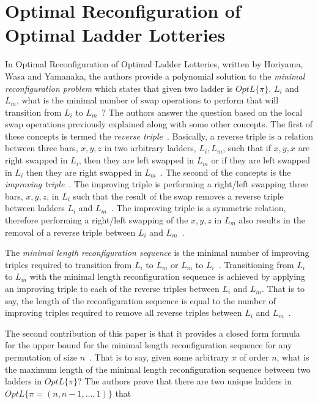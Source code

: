 
\section{Optimal Reconfiguration of Optimal Ladder Lotteries}
In Optimal Reconfiguration of Optimal Ladder Lotteries, written by Horiyama, Wasa and Yamanaka,
the authors provide a polynomial solution to the 
\emph{minimal reconfiguration problem} which states that given 
two ladder is $OptL\{\pi\}$, $L_{i}$ and  $L_{m}$, what is the minimal number of 
swap operations to perform that will transition from $L_{i}$ to $L_{m}$~\cite{A2}?
The authors answer the question based on the local swap operations previously 
explained along with some other concepts. The first of these concepts 
is termed the \emph{reverse triple}~\cite{A2}. Basically, a reverse triple is a relation
between three bars, $x,y,z$ in two arbitrary ladders, $L_{i}, L_{m}$, such that if $x,y,x$
are right swapped in $L_{i}$, then they are left swapped in $L_{m}$ or if they are 
left swapped in $L_{i}$ then they are right swapped in $L_{m}$~\cite{A2}. 
The second of the concepts is the \emph{improving triple}~\cite{A2}. The improving triple is 
performing a right/left swapping three bars, $x,y,z$, in $L_{i}$ such that the 
result of the swap removes a reverse triple between
ladders $L_{i}$ and $L_{m}$~\cite{A2}. The improving triple is a symmetric 
relation, therefore performing a right/left swapping of the $x,y,z$ in $L_{m}$ also results in the 
removal of a reverse triple between $L_{i}$ and $L_{m}$~\cite{A2}.\par
The \emph{minimal length reconfiguration sequence} is the minimal number of 
improving triples required to transition from $L_{i}$ to $L_{m}$ or 
$L_{m}$ to $L_{i}$~\cite{A2}. Transitioning from $L_{i}$ to $L_{m}$ with the minimal length reconfiguration sequence 
is achieved by applying an improving triple to each of the reverse triples between 
$L_{i}$ and $L_{m}$. That is to say, the length of the reconfiguration sequence 
is equal to the number of improving triples required to remove all reverse triples between $L_{i}$ and  $L_{m}$~\cite{A2}.\par
The second contribution of this paper is that it provides a closed form formula for the 
upper bound for the minimal length reconfiguration sequence for any permutation 
of size $n$~\cite{A2}. That is to say, given some arbitrary $\pi$ of order $n$, what is the maximum 
length of the minimal length reconfiguration sequence between two ladders in $OptL\{\pi\}$?
The authors prove that there are two unique ladders in $OptL\{\pi=(n, n-1, \dots, 1)\}$ that 
